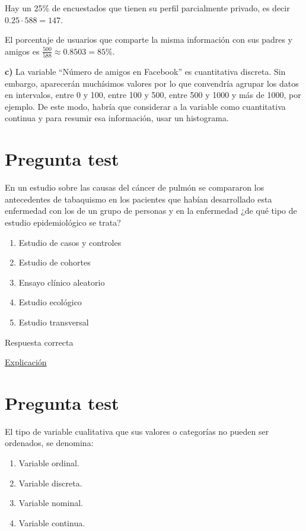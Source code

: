 \documentclass[
]{book}
\providecommand{\tightlist}{%
  \setlength{\itemsep}{0pt}\setlength{\parskip}{0pt}}
\begin{document}
Hay un 25\% de encuestados que tienen su perfil parcialmente privado, es decir \(0.25 \cdot 588 = 147\).

El porcentaje de usuarios que comparte la misma información con sus padres y amigos es \(\frac{500}{588} \approx 0.8503 = 85\%\).

\textbf{c)} La variable ``Número de amigos en Facebook'' es cuantitativa discreta. Sin embargo, aparecerán muchísimos valores por lo que convendría agrupar los datos en intervalos, entre 0 y 100, entre 100 y 500, entre 500 y 1000 y más de 1000, por ejemplo. De este modo, habría que considerar a la variable como cuantitativa continua y para resumir esa información, usar un histograma.

\hypertarget{pregunta-test-40}{%
\section{Pregunta test}\label{pregunta-test-40}}

En un estudio sobre las causas del cáncer de pulmón se compararon los antecedentes de tabaquismo en los pacientes que habían desarrollado esta enfermedad con los de un grupo de personas y en la enfermedad ¿de qué tipo de estudio epidemiológico se trata?

\begin{enumerate}
\def\labelenumi{\alph{enumi})}
\tightlist
\item
  Estudio de casos y controles
\item
  Estudio de cohortes
\item
  Ensayo clínico aleatorio
\item
  Estudio ecológico
\item
  Estudio transversal
\end{enumerate}

Respuesta correcta

\href{http://www.scielo.org.pe/scielo.php?script=sci_arttext\&pid=S2308-05312020000100138}{Explicación}

\hypertarget{pregunta-test-41}{%
\section{Pregunta test}\label{pregunta-test-41}}

El tipo de variable cualitativa que sus valores o categorías no pueden ser ordenados, se denomina:

\begin{enumerate}
\def\labelenumi{\alph{enumi})}
\tightlist
\item
  Variable ordinal.
\item
  Variable discreta.
\item
  Variable nominal.
\item
  Variable continua.
\end{enumerate}
\end{document}
